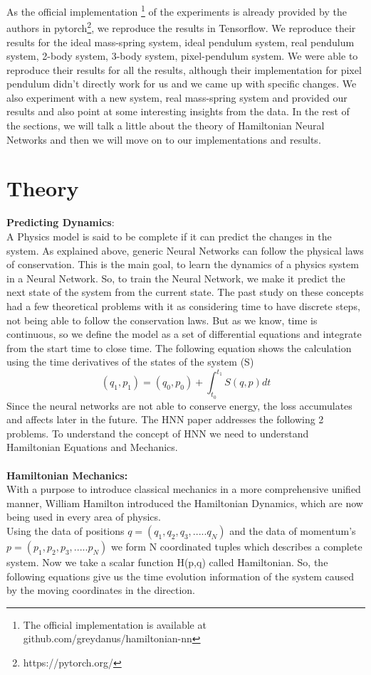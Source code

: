 \documentclass{article}
\begin{document}
As the official implementation \footnote{The official implementation is available at github.com/greydanus/hamiltonian-nn} of the experiments is already provided by the authors in pytorch\footnote{https://pytorch.org/}, we reproduce the results in Tensorflow. We reproduce their results for the ideal mass-spring system, ideal pendulum system, real pendulum system, 2-body system, 3-body system, pixel-pendulum system. We were able to reproduce their results for all the results, although their implementation for pixel pendulum didn't directly work for us and we came up with specific changes. We also experiment with a new system, real mass-spring system and provided our results and also point at some interesting insights from the data. In the rest of the sections, we will talk a little about the theory of Hamiltonian Neural Networks and then we will move on to our implementations and results.

\section{Theory}
\textbf{Predicting Dynamics}:\\
A Physics model is said to be complete if it can predict the changes in the system. As explained above, generic Neural Networks can follow the physical laws of conservation. This is the main goal, to learn the dynamics of a physics system in a Neural Network. So, to train the Neural Network, we make it predict the next state of the system from the current state. The past study on these concepts had a few theoretical problems with it as considering time to have discrete steps, not being able to follow the conservation laws. But as we know, time is continuous, so we define the model as a set of differential equations and integrate from the start time to close time. The following equation shows the calculation using the time derivatives of the states of the system (S)
\begin{equation}\label{sam0}
(q_1, p_1) = (q_0, p_0) + \int_{t_0}^{t_1} S(q,p) dt
\end{equation}
Since the neural networks are not able to conserve energy, the loss accumulates and affects later in the future. The HNN paper addresses the following 2 problems. To understand the concept of HNN we need to understand Hamiltonian Equations and Mechanics.\\
\noindent
\\
\textbf{Hamiltonian Mechanics:}\\
With a purpose to introduce classical mechanics in a more comprehensive unified manner, William Hamilton introduced the Hamiltonian Dynamics, which are now being used in every area of physics. \\
Using the data of positions $ q = (q_1, q_2, q_3, .....q_N) $ and the data of momentum's $ p = (p_1, p_2, p_3, .....p_N) $ we form N coordinated tuples which describes a complete system. Now we take a scalar function H(p,q) called Hamiltonian. So, the following equations give us the time evolution information of the system caused by the moving coordinates in the direction.
\end{document}
